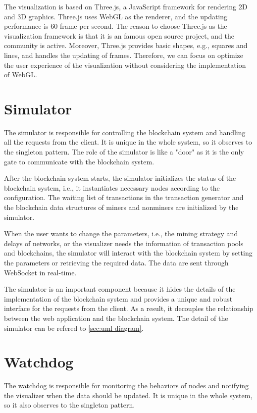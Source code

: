 The visualization is based on Three.js, a JavaScript framework for rendering 2D and 3D graphics. Three.js uses WebGL as the renderer, and the updating performance is 60 frame per second. The reason to choose Three.js as the visualization framework is that it is an famous open source project, and the community is active. Moreover, Three.js provides basic shapes, e.g., squares and lines, and handles the updating of frames. Therefore, we can focus on optimize the user experience of the visualization without considering the implementation of WebGL.

\section{Simulator}

The simulator is responsible for controlling the blockchain system and handling all the requests from the client. It is unique in the whole system, so it observes to the singleton pattern. The role of the simulator is like a "door" as it is the only gate to communicate with the blockchain system.

After the blockchain system starts, the simulator initializes the status of the blockchain system, i.e., it instantiates necessary nodes according to the configuration. The waiting list of transactions in the transaction generator and the blockchain data structures of miners and nonminers are initialized by the simulator. 

When the user wants to change the parameters, i.e., the mining strategy and delays of networks, or the visualizer needs the information of transaction pools and blockchains, the simulator will interact with the blockchain system by setting the parameters or retrieving the required data. The data are sent through WebSocket in real-time.

The simulator is an important component because it hides the details of the implementation of the blockchain system and provides a unique and robust interface for the requests from the client. As a result, it decouples the relationship between the web application and the blockchain system. The detail of the simulator can be refered to \ref{sec:uml diagram}.

\section{Watchdog}

The watchdog is responsible for monitoring the behaviors of nodes and notifying the visualizer when the data should be updated. It is unique in the whole system, so it also observes to the singleton pattern.

